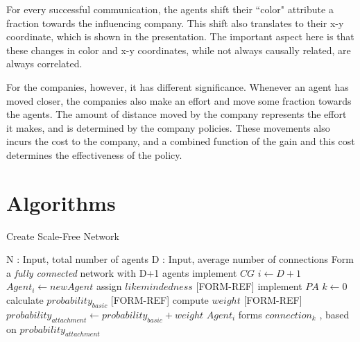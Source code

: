 For every successful communication, the agents shift their ``color" attribute a fraction towards the influencing company. This shift also translates to their x-y coordinate, which is shown in the presentation. The important aspect here is that these changes in color and x-y coordinates, while not always causally related, are always correlated. 

For the companies, however, it has different significance. Whenever an agent has moved closer, the companies also make an effort and move some fraction towards the agents. The amount of distance moved by the company represents the effort it makes, and is determined by the company policies. These movements also incurs the cost to the company, and a combined function of the gain and this cost determines the effectiveness of the policy.





\section{Algorithms}

\begin{algorithm}
\caption{Create Scale-Free Network}
\label{ag1}
\begin{algorithmic}
\STATE N : Input, total number of agents
\STATE D : Input, average number of connections
	\STATE Form a \emph{fully connected} network with D+1 agents
\ENDIF 
\STATE implement $CG$
\STATE $i \gets D+1$
	\STATE $Agent_i \gets newAgent$
	\STATE assign $likemindedness$ [FORM-REF]
	\STATE implement $PA$
	\STATE $k \gets 0$
		\STATE calculate $probability_{basic}$ [FORM-REF]
		\STATE compute $weight$ [FORM-REF]
		\STATE $probability_{attachment} \gets  probability_{basic} + weight$ 
		\STATE $Agent_i$ forms $connection_k$ , based on $probability_{attachment}$
	\ENDWHILE	
\ENDWHILE
\end{algorithmic}
\end{algorithm}

\clearpage


